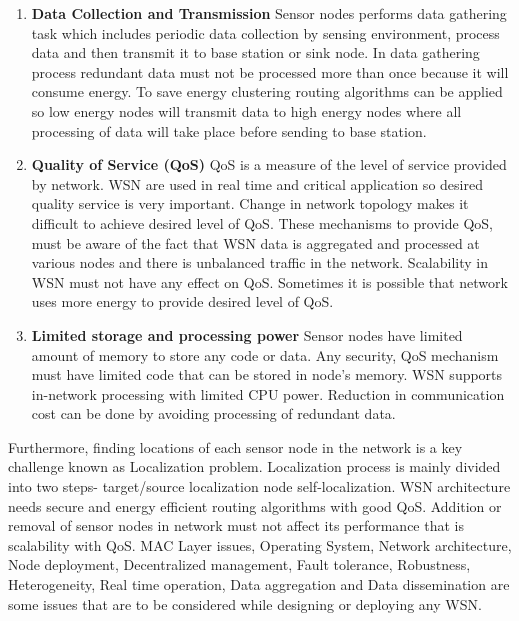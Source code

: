 \begin{enumerate}[label=\textbf{\roman*.}]
    \item \textbf{Data Collection and Transmission }
    Sensor nodes performs data gathering task which includes periodic data collection by sensing environment, process data and then transmit it to base station or sink node. In data gathering process redundant data must not be processed more than once because it will consume energy. To save energy clustering routing algorithms can be applied so low energy nodes will transmit data to high energy nodes where all processing of data will take place before sending to base station.
    \item \textbf{Quality of Service (QoS) }
    QoS is a measure of the level of service provided by network. WSN are used in real time and critical application so desired quality service is very important. Change in network topology makes it difficult to achieve desired level of QoS. These mechanisms to provide QoS, must be aware of the fact that WSN data is aggregated and processed at various nodes and there is unbalanced traffic in the network. Scalability in WSN must not have any effect on QoS. Sometimes it is possible that network uses more energy to provide desired level of QoS.
    \item \textbf{Limited storage and processing power }
    Sensor nodes have limited amount of memory to store any code or data. Any security, QoS mechanism must have limited code that can be stored in node’s memory. WSN supports in-network processing with limited CPU power. Reduction in communication cost can be done by avoiding processing of redundant data.
\end{enumerate}
Furthermore, finding locations of each sensor node in the network is a key challenge known as Localization problem. Localization process is mainly divided into two steps- target/source localization node self-localization. WSN architecture needs secure and energy efficient routing algorithms with good QoS. Addition or removal of sensor nodes in network must not affect its performance that is scalability with QoS. MAC Layer issues, Operating System, Network  architecture, Node deployment, Decentralized management, Fault tolerance, Robustness, Heterogeneity, Real time operation, Data aggregation and Data dissemination are some issues that are to be considered while designing or deploying any WSN.

